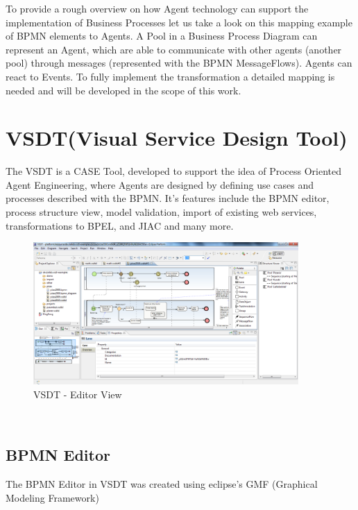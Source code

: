 To provide a rough overview on how Agent technology can support the implementation of Business Processes let us take a look on this mapping example of BPMN elements to Agents. A Pool in a Business Process Diagram can represent an Agent, which are able to communicate with other agents (another pool) through messages (represented with the BPMN MessageFlows). Agents can react to Events. To fully implement the transformation a detailed mapping is needed and will be developed in the scope of this work. 


\section{VSDT(Visual Service Design Tool)}
\label{sec:vsdt}
The VSDT is a CASE Tool, developed to support the idea of Process Oriented Agent Engineering, where Agents are designed by defining use cases and processes described with the BPMN. It's features include the BPMN editor, process structure view, model validation, import of existing web services, transformations to BPEL, and JIAC and many more. 
\begin{figure}[h]
	\centering
		\includegraphics[width=0.90\textwidth]{images/vsdt_snapshot.png}
	\caption{VSDT - Editor View}
	\label{fig:VSDT}
\end{figure}\\

\subsection{BPMN Editor}
The BPMN Editor in VSDT was created using eclipse's GMF (Graphical Modeling Framework)

